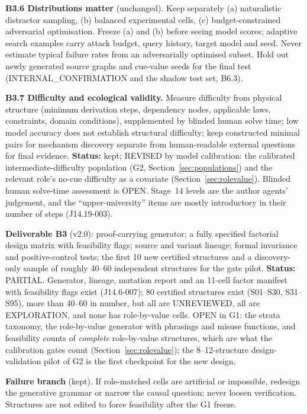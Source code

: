 \documentclass[10pt,a4paper]{article}
\begin{document}
\textbf{B3.6 Distributions matter} (unchanged). Keep separately (a) naturalistic distractor sampling, (b) balanced
experimental cells, (c) budget-constrained adversarial optimisation. Freeze (a) and (b) before seeing model
scores; adaptive search examples carry attack budget, query history, target model and seed. Never estimate typical
failure rates from an adversarially optimised subset. Hold out newly generated source graphs and cue-value seeds
for the final test (INTERNAL\_CONFIRMATION and the shadow test set, B6.3).

\textbf{B3.7 Difficulty and ecological validity.} Measure difficulty from physical structure (minimum derivation
steps, dependency nodes, applicable laws, constraints, domain conditions), supplemented by blinded human solve
time; low model accuracy does not establish structural difficulty; keep constructed minimal pairs for mechanism
discovery separate from human-readable external questions for final evidence. \textbf{Status:} kept; REVISED by
model calibration: the calibrated intermediate-difficulty population (G2, Section~\ref{sec:populations}) and the
relevant role's no-cue difficulty as a covariate (Section~\ref{sec:rolevalue}). Blinded human solve-time
assessment is OPEN. Stage~14 levels are the author agents' judgement, and the ``upper-university'' items are
mostly introductory in their number of steps (J14.19-003).

\textbf{Deliverable B3} (v2.0): proof-carrying generator; a fully specified factorial design matrix with
feasibility flags; source and variant lineage; formal invariance and positive-control tests; the first 10 new
certified structures and a discovery-only sample of roughly 40--60 independent structures for the gate pilot.
\textbf{Status:} PARTIAL. Generator, lineage, mutation report and an 11-cell factor manifest with feasibility
flags exist (J14.6-007); 80 certified structures exist (S01--S30, S31--S95), more than 40--60 in number, but all are
UNREVIEWED, all are EXPLORATION, and none has role-by-value cells. OPEN in G1: the strata taxonomy, the
role-by-value generator with phrasings and misuse functions, and feasibility counts of \emph{complete}
role-by-value structures, which are what the calibration gates count (Section~\ref{sec:rolevalue}); the
8--12-structure design-validation pilot of G2 is the first checkpoint for the new design.

\textbf{Failure branch} (kept). If role-matched cells are artificial or impossible, redesign the generative
grammar or narrow the causal question; never loosen verification. Structures are not edited to force feasibility
after the G1 freeze.
\end{document}
